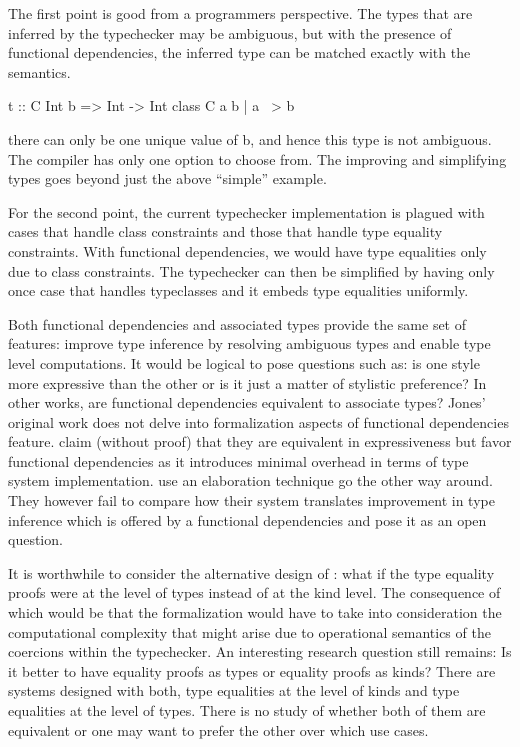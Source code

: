 \documentclass[screen,nonacm,manuscript,review]{acmart} %
\begin{document}
The first point is good from a programmers perspective. The types that
are inferred by the typechecker may be ambiguous, but with the presence of
functional dependencies, the inferred type can be matched exactly with
the semantics.

\begin{code}
  t :: C Int b => Int -> Int
  class C a b | a ~> b
\end{code}

there can only be one unique value of b, and hence this type is not
ambiguous. The compiler has only one option to choose from.
The improving and simplifying types goes beyond just the above
``simple'' example.

For the second point, the current typechecker implementation is
plagued with cases that handle class constraints and those that handle
type equality constraints. With functional dependencies, we would have
type equalities only due to class constraints. The typechecker can
then be simplified by having only once case that handles typeclasses
and it embeds type equalities uniformly. 

Both functional dependencies and associated types provide the same set
of features: improve type inference by resolving ambiguous types and
enable type level computations. It would be logical to pose
questions such as: is one style more expressive than the other or is
it just a matter of stylistic preference? In other works, are
functional dependencies equivalent to associate types? Jones' original
work does not delve into formalization aspects of functional
dependencies feature. \citet{jones_language_2008} claim (without
proof) that they  are equivalent in expressiveness but favor
functional dependencies as it introduces minimal overhead in terms of
type system implementation. \citet{karachalias_elaboration_2017} use
an elaboration technique go the other way around. They however fail to
compare how their system translates improvement in type inference
which is offered by a functional dependencies and pose it as an open
question.


It is worthwhile to consider the alternative design of \SFC: what if
the type equality proofs were at the level of types instead of at the kind
level. The consequence of which would be that the formalization would
have to take into consideration the computational complexity that
might arise due to operational semantics of the coercions within the
typechecker. An interesting research question still remains: Is it
better to have equality proofs as types or equality proofs as kinds?
There are systems designed with both, type equalities at the level of
kinds and type equalities at the level of types. There is no study of
whether both of them are equivalent or one may want to prefer the
other over which use cases.
\end{document}
